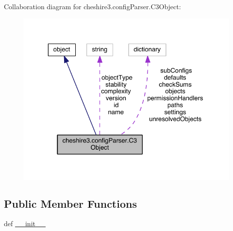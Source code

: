 Collaboration diagram for cheshire3.\-config\-Parser.\-C3\-Object\-:
\nopagebreak
\begin{figure}[H]
\begin{center}
\leavevmode
\includegraphics[width=325pt]{classcheshire3_1_1config_parser_1_1_c3_object__coll__graph}
\end{center}
\end{figure}
\subsection*{Public Member Functions}
\begin{DoxyCompactItemize}
\item 
def \hyperlink{classcheshire3_1_1config_parser_1_1_c3_object_a1e28f1191801574a39497fb42704c194}{\-\_\-\-\_\-init\-\_\-\-\_\-}
\end{DoxyCompactItemize}
